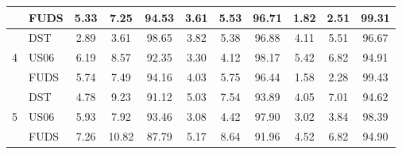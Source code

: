 \begin{table}[htbp]
{\begin{tabular}{ c| l| c c c| c c c |c c c}
      & FUDS & 5.33 & 7.25 & 94.53 & 3.61 & 5.53 & 96.71 & 1.82 & 2.51 & 99.31 \\ 
    \hline
      & DST & 2.89 & 3.61 & 98.65 & 3.82 & 5.38 & 96.88 & 4.11 & 5.51 & 96.67 \\ 
    4 & US06 & 6.19 & 8.57 & 92.35 & 3.30 & 4.12 & 98.17 & 5.42 & 6.82 & 94.91 \\ 
      & FUDS & 5.74 & 7.49 & 94.16 & 4.03 & 5.75 & 96.44 & 1.58 & 2.28 & 99.43 \\ 
    \hline
      & DST & 4.78 & 9.23 & 91.12 & 5.03 & 7.54 & 93.89 & 4.05 & 7.01 & 94.62 \\ 
    5 & US06 & 5.93 & 7.92 & 93.46 & 3.08 & 4.42 & 97.90 & 3.02 & 3.84 & 98.39 \\ 
      & FUDS & 7.26 & 10.82 & 87.79 & 5.17 & 8.64 & 91.96 & 4.52 & 6.82 & 94.90 \\ 

    

\end{tabular}}
\end{table}
